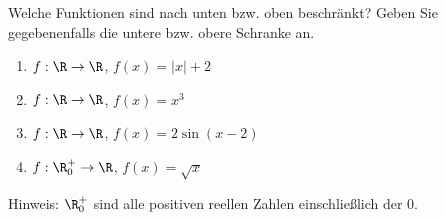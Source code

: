 \begin{ExerciseBlock}
Welche Funktionen sind nach unten bzw. oben beschränkt? Geben Sie gegebenenfalls die untere bzw. obere Schranke an.
\begin{enumerate}[label=\alph*)]
\item $f:\R \rightarrow \R$, $f(x)=|x| + 2$
\item $f:\R \rightarrow \R$, $f(x)=x^3$
\item $f:\R \rightarrow \R$, $f(x)=2 \sin(x - 2)$
\item $f: \R_0^+ \rightarrow \R$, $f(x)=\sqrt{x}$
\end{enumerate}
Hinweis: $\R_0^+$ sind alle positiven reellen Zahlen einschließlich der 0.

\end{ExerciseBlock}
